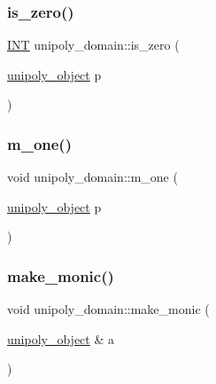 \mbox{\label{classunipoly__domain_a8d6d9ffa76769e4ff00e9dcb794e9dbf}} 
\subsubsection{\texorpdfstring{is\+\_\+zero()}{is\_zero()}}
{\footnotesize\ttfamily \mbox{\hyperlink{galois_8h_a09fddde158a3a20bd2dcadb609de11dc}{I\+NT}} unipoly\+\_\+domain\+::is\+\_\+zero (\begin{DoxyParamCaption}\item[{\mbox{\hyperlink{galois_8h_a77ca58de3d2da6172242493dd9c8aaa8}{unipoly\+\_\+object}}}]{p }\end{DoxyParamCaption})}

\mbox{\label{classunipoly__domain_a5737334cd7d2cf48d488df9bef86b7a0}} 
\subsubsection{\texorpdfstring{m\+\_\+one()}{m\_one()}}
{\footnotesize\ttfamily void unipoly\+\_\+domain\+::m\+\_\+one (\begin{DoxyParamCaption}\item[{\mbox{\hyperlink{galois_8h_a77ca58de3d2da6172242493dd9c8aaa8}{unipoly\+\_\+object}}}]{p }\end{DoxyParamCaption})}

\mbox{\label{classunipoly__domain_a54fee538f11c093f0ae86973c079380b}} 
\subsubsection{\texorpdfstring{make\+\_\+monic()}{make\_monic()}}
{\footnotesize\ttfamily void unipoly\+\_\+domain\+::make\+\_\+monic (\begin{DoxyParamCaption}\item[{\mbox{\hyperlink{galois_8h_a77ca58de3d2da6172242493dd9c8aaa8}{unipoly\+\_\+object}} \&}]{a }\end{DoxyParamCaption})}


